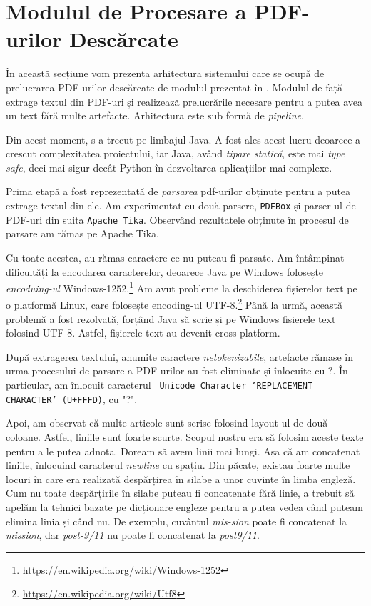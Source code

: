\section{Modulul de Procesare a PDF-urilor Descărcate}
\label{section:pdf-parsing}

În această secțiune vom prezenta arhitectura sistemului care se ocupă de prelucrarea PDF-urilor descărcate de modulul prezentat în  . Modulul de față extrage textul din PDF-uri și realizează prelucrările necesare pentru a putea avea un text fără multe artefacte. Arhitectura este sub formă de \textit{pipeline}.

Din acest moment, s-a trecut pe limbajul Java. A fost ales acest lucru deoarece a crescut complexitatea proiectului, iar Java, având \textit{tipare statică}, este mai \textit{type safe}, deci mai sigur decât Python în dezvoltarea aplicațiilor mai complexe.

Prima etapă a fost reprezentată de \textit{parsarea} pdf-urilor obținute pentru a putea extrage textul din ele. Am experimentat cu două parsere, \texttt{PDFBox} și parser-ul de PDF-uri din suita \texttt{Apache Tika}. Observând rezultatele obținute în procesul de parsare am rămas pe Apache Tika. 

Cu toate acestea, au rămas caractere ce nu puteau fi parsate. Am întâmpinat dificultăți la encodarea caracterelor, deoarece Java pe Windows folosește \textit{encoduing-ul} Windows-1252.\footnote{\url{https://en.wikipedia.org/wiki/Windows-1252}} Am avut probleme la deschiderea fișierelor text pe o platformă Linux, care folosește encoding-ul UTF-8.\footnote{\url{https://en.wikipedia.org/wiki/Utf8}} Până la urmă, această problemă a fost rezolvată, forțând Java să scrie și pe Windows fișierele text folosind UTF-8. Astfel, fișierele text au devenit cross-platform.

După extragerea textului, anumite caractere \textit{netokenizabile}, artefacte rămase în urma procesului de parsare a PDF-urilor au fost eliminate și înlocuite cu ?. În particular, am înlocuit caracterul \texttt{
Unicode Character 'REPLACEMENT CHARACTER' (U+FFFD)}, cu "?".

Apoi, am observat că multe articole sunt scrise folosind layout-ul de două coloane. Astfel, liniile sunt foarte scurte. Scopul nostru era să folosim aceste texte pentru a le putea adnota. Doream să avem linii mai lungi. Așa că am concatenat liniile, înlocuind caracterul \textit{newline} cu spațiu. Din păcate, existau foarte multe locuri în care era realizată despărțirea în silabe a unor cuvinte în limba engleză. Cum nu toate despărțirile în silabe puteau fi concatenate fără linie, a trebuit să apelăm la tehnici bazate pe dicționare engleze pentru a putea vedea când puteam elimina linia și când nu. De exemplu, cuvântul \textit{mis-sion} poate fi concatenat la \textit{mission}, dar \textit{post-9/11} nu poate fi concatenat la \textit{post9/11}.


